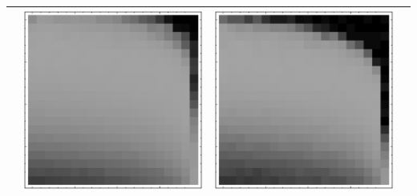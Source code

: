\documentclass[10pt]{article}
\begin{document}
\begin{tabular}{|c|c|c|c|}
        & \includegraphics[scale=0.25]{plots/simple/LF-40T10T-20T10-MNIST-6.eps}
        & \includegraphics[scale=0.25]{plots/simple/LF-40T20T10T-20T10-MNIST-6.eps} \\ \hline

\end{tabular}
\end{document}
